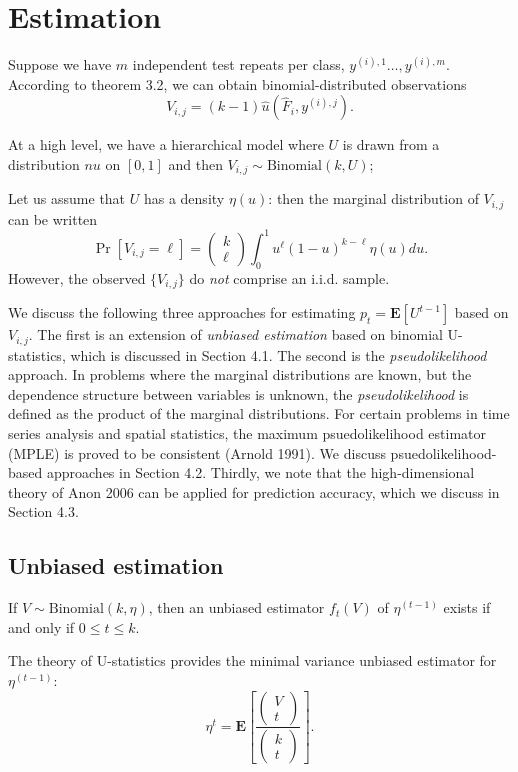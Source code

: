 \documentclass{article}
\newcommand{\E}{\textbf{E}}
\begin{document}
\section{Estimation}

Suppose we have $m$ independent test repeats per class, $y^{(i),1}\hdots, y^{(i), m}$.
According to theorem 3.2, we can obtain binomial-distributed observations
\[
V_{i,j} = (k-1)\hat{u}(\hat{F}_i, y^{(i), j}).
\]

At a high level, we have a hierarchical model where $U$ is drawn from a distribution $nu$ on $[0, 1]$
and then $V_{i, j} \sim \text{Binomial}(k, U)$;

Let us assume that $U$ has a density $\eta(u)$: then the marginal distribution of $V_{i, j}$ can be written
\[
\Pr[V_{i,j} = \ell] = \begin{pmatrix}
k \\ \ell
\end{pmatrix}
\int_0^1 u^\ell (1-u)^{k-\ell} \eta(u) du.
\]
However, the observed $\{V_{i, j}\}$ do \emph{not} comprise an i.i.d. sample.

We discuss the following three approaches for estimating $p_t =
\E[U^{t-1}]$ based on $V_{i, j}$.  The first is an extension of \emph{unbiased
  estimation} based on binomial U-statistics, which is discussed in
Section 4.1.  The second is the \emph{pseudolikelihood} approach.  In
problems where the marginal distributions are known, but the
dependence structure between variables is unknown, the
\emph{pseudolikelihood} is defined as the product of the marginal
distributions.  For certain problems in time series analysis and
spatial statistics, the maximum psuedolikelihood estimator (MPLE) is
proved to be consistent (Arnold 1991).  We discuss psuedolikelihood-based
approaches in Section 4.2.  Thirdly, we note that the high-dimensional
theory of Anon 2006 can be applied for prediction accuracy, which we discuss in Section 4.3.

\subsection{Unbiased estimation}

If $V \sim \text{Binomial}(k, \eta)$, then an unbiased estimator $f_t(V)$ of $\eta^(t-1)$ exists
if and only if $0 \leq t \leq k$.

The theory of U-statistics provides the minimal variance unbiased estimator for $\eta^(t-1)$:
\[
\eta^t = \E\left[\frac{\begin{pmatrix}
V \\ t
\end{pmatrix}}{\begin{pmatrix}
k \\ t
\end{pmatrix}}\right].
\]
\end{document}
